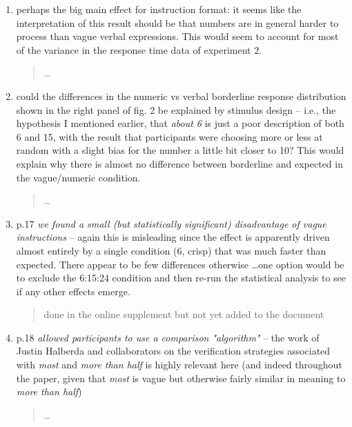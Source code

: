 \documentclass{tufte-handout}
\begin{document}
\begin{enumerate}
\item perhaps the big main effect for instruction format: it seems like the interpretation of this result should be that numbers are in general harder to process than vague verbal expressions. This would seem to account for most of the variance in the response time data of experiment 2.
\begin{quote}\ldots\end{quote}

\item could the differences in the numeric vs verbal borderline response distribution shown in the right panel of fig. 2 be explained by stimulus design -- i.e., the hypothesis I mentioned earlier, that \emph{about 6} is just a poor description of both 6 and 15, with the result that participants were choosing more or less at random with a slight bias for the number a little bit closer to 10? This would explain why there is almost no difference between borderline and expected in the vague/numeric condition.
\begin{quote}\ldots\end{quote}

\item p.17 \emph{we found a small (but statistically significant) disadvantage of vague instructions} -- again this is misleading since the effect is apparently driven almost entirely by a single condition (6, crisp) that was much faster than expected. There appear to be few differences otherwise \ldots one option would be to exclude the 6:15:24 condition and then re-run the statistical analysis to see if any other effects emerge.
\begin{quote}done in the online supplement but not yet added to the document\end{quote}

\item p.18 \emph{allowed participants to use a comparison "algorithm"} -- the work of Justin Halberda and collaborators on the verification strategies associated with \emph{most} and \emph{more than half} is highly relevant here (and indeed throughout the paper, given that \emph{most} is vague but otherwise fairly similar in meaning to \emph{more than half})
\begin{quote}\ldots\end{quote}


\end{enumerate}
\end{document}
